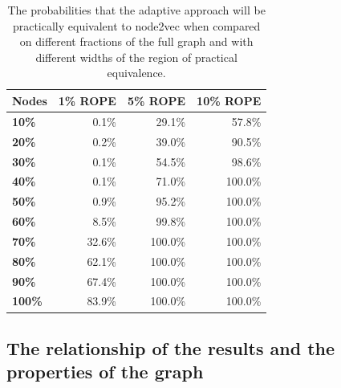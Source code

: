 \begin{table}
  \begin{center}
    \begin{minipage}{210pt} %
      \caption{The probabilities that the adaptive approach will be practically equivalent to node2vec when compared on different fractions of the full graph and with different widths of the region of practical equivalence.}
      \label{tab:bayesian-adaptive}
      \begin{tabular}{lrrr}
        \toprule
        \textbf{Nodes} & \textbf{1\% ROPE} & \textbf{5\% ROPE} & \textbf{10\% ROPE} \\
        \midrule
        \textbf{10\%}  & 0.1\%             & 29.1\%            & 57.8\%             \\
        \textbf{20\%}  & 0.2\%             & 39.0\%            & 90.5\%             \\
        \textbf{30\%}  & 0.1\%             & 54.5\%            & 98.6\%             \\
        \textbf{40\%}  & 0.1\%             & 71.0\%            & 100.0\%            \\
        \textbf{50\%}  & 0.9\%             & 95.2\%            & 100.0\%            \\
        \textbf{60\%}  & 8.5\%             & 99.8\%            & 100.0\%            \\
        \textbf{70\%}  & 32.6\%            & 100.0\%           & 100.0\%            \\
        \textbf{80\%}  & 62.1\%            & 100.0\%           & 100.0\%            \\
        \textbf{90\%}  & 67.4\%            & 100.0\%           & 100.0\%            \\
        \textbf{100\%} & 83.9\%            & 100.0\%           & 100.0\%            \\
        \bottomrule
      \end{tabular}
    \end{minipage}
  \end{center}
\end{table}

\subsection{The relationship of the results and the properties of the graph}

